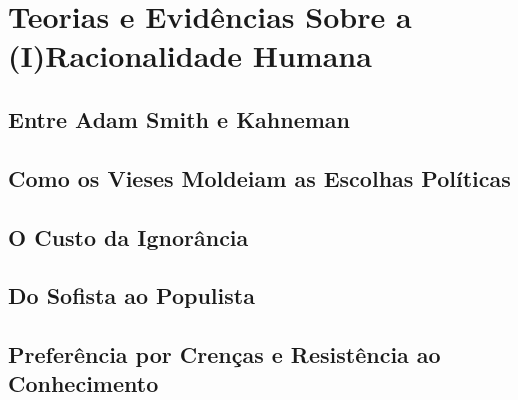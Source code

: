 \chapter{Teorias e Evidências Sobre a (I)Racionalidade Humana} %


\section{Entre Adam Smith e Kahneman} %


\section{Como os Vieses Moldeiam as Escolhas Políticas} %


\section{O Custo da Ignorância} %


\section{Do Sofista ao Populista} %


\section{Preferência por Crenças e Resistência ao Conhecimento}

